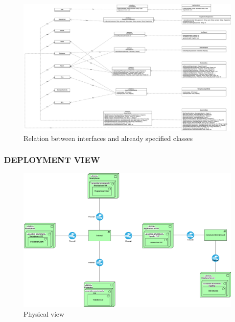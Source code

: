 \begin{figure}[h!]
	\centering
	\includegraphics[angle=90, scale=0.28]{Images/interface_diagram}
	\caption{Relation between interfaces and already specified classes}
\end{figure}
\newpage
\subsubsection{DEPLOYMENT VIEW}

\begin{figure}[h!]
	\centering
	\includegraphics[width=\textwidth]{Images/physical_view}
	\caption{Physical view}
\end{figure}

